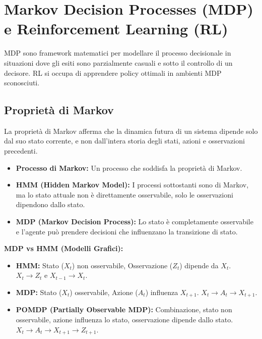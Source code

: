 \documentclass[a4paper,11pt]{article}
\begin{document}
\section{Markov Decision Processes (MDP) e Reinforcement Learning (RL)}

MDP sono framework matematici per modellare il processo decisionale in situazioni dove gli esiti sono parzialmente casuali e sotto il controllo di un decisore. RL si occupa di apprendere policy ottimali in ambienti MDP sconosciuti.

\subsection{Proprietà di Markov}
La proprietà di Markov afferma che la dinamica futura di un sistema dipende solo dal suo stato corrente, e non dall'intera storia degli stati, azioni e osservazioni precedenti.
\begin{itemize}
    \item \textbf{Processo di Markov:} Un processo che soddisfa la proprietà di Markov.
    \item \textbf{HMM (Hidden Markov Model):} I processi sottostanti sono di Markov, ma lo stato attuale non è direttamente osservabile, solo le osservazioni dipendono dallo stato.
    \item \textbf{MDP (Markov Decision Process):} Lo stato è completamente osservabile e l'agente può prendere decisioni che influenzano la transizione di stato.
\end{itemize}
\textbf{MDP vs HMM (Modelli Grafici):}
\begin{itemize}
    \item \textbf{HMM:} Stato ($X_t$) non osservabile, Osservazione ($Z_t$) dipende da $X_t$. $X_t \to Z_t$ e $X_{t-1} \to X_t$.
    \item \textbf{MDP:} Stato ($X_t$) osservabile, Azione ($A_t$) influenza $X_{t+1}$. $X_t \to A_t \to X_{t+1}$.
    \item \textbf{POMDP (Partially Observable MDP):} Combinazione, stato non osservabile, azione influenza lo stato, osservazione dipende dallo stato. $X_t \to A_t \to X_{t+1} \to Z_{t+1}$.
\end{itemize}
\end{document}
